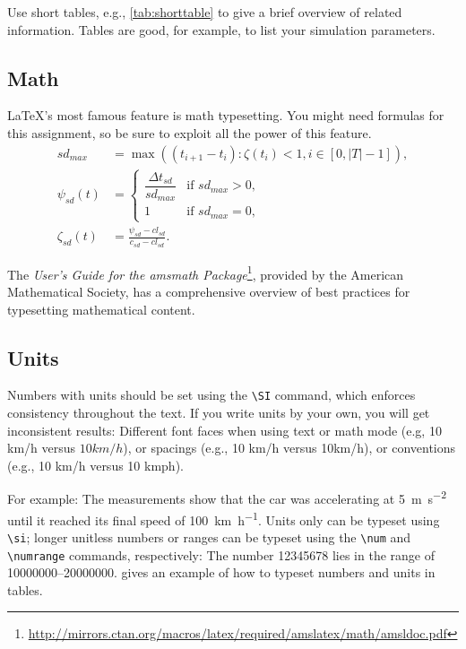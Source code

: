 Use short tables, e.g., \cref{tab:shorttable} to give a brief overview of related information.
Tables are good, for example, to list your simulation parameters.

\subsection{Math}

\LaTeX's most famous feature is math typesetting.
You might need formulas for this assignment, so be sure to exploit all the power of this feature.
\begin{align}
sd_{max} &=
	\max\left(
		(t_{i+1} - t_i)
			: \zeta(t_i) < 1, i \in [0, |T|-1]
	\right)
,\\
\psi_{sd}(t) &=
	\begin{cases}
		\dfrac{\Delta t_{sd}}{sd_{max}}
			& \text{if $sd_{max} > 0$}, \\
		1
			& \text{if $sd_{max} = 0$},
	\end{cases}
\\
\zeta_{sd}(t) &= 
	\frac{
		\psi_{sd} - cl_{sd}
	}{
		c_{sd} - cl_{sd}
	}
.
\end{align}

The \emph{User's Guide for the amsmath Package}\footnote{\url{http://mirrors.ctan.org/macros/latex/required/amslatex/math/amsldoc.pdf}}, provided by the American Mathematical Society, has a comprehensive overview of best practices for typesetting mathematical content.

\subsection{Units}

Numbers with units should be set using the \verb|\SI| command, which enforces consistency throughout the text.
If you write units by your own, you will get inconsistent results: Different font faces when using text or math mode (e.g, 10 km/h versus $10 km/h$), or spacings (e.g., 10 km/h versus 10km/h), or conventions (e.g., 10 km/h versus 10 kmph).

For example: The measurements show that the car was accelerating at \SI{5}{\meter\per\second\squared} until it reached its final speed of \SI{100}{\kilo\meter\per\hour}.
Units only can be typeset using \verb|\si|; longer unitless numbers or ranges can be typeset using the \verb|\num| and \verb|\numrange| commands, respectively: The number \num{12345678} lies in the range of \numrange{10000000}{20000000}.
 gives an example of how to typeset numbers and units in tables.

